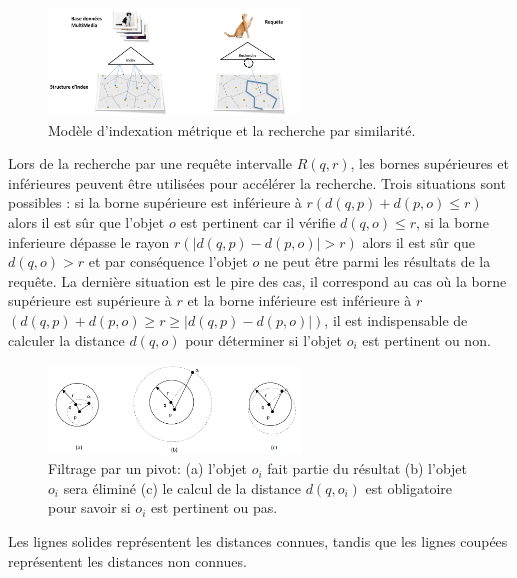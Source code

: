 \begin{figure}[H]
	\centering
	\includegraphics[width=0.6\textwidth]{Figures/similarity.png} %
	\caption{Modèle d'indexation métrique et la recherche par similarité.}
\end{figure}

Lors de la recherche par une requête intervalle $ R(q,r) $, les bornes supérieures et inférieures peuvent être utilisées pour accélérer la recherche. Trois situations sont possibles : si la borne supérieure est inférieure à $  r (d(q,p)+d(p,o) \leq r ) $ alors il est sûr que l’objet $ o $ est pertinent car il vérifie $ d(q,o) \leq r $, si la borne inferieure dépasse le rayon $ r ( |d(q,p)-d(p,o)| > r )  $ alors il est sûr que $ d(q,o) > r $ et par conséquence l’objet $ o $ ne peut être parmi les résultats de la requête. La dernière situation est le pire des cas, il correspond au cas où la borne supérieure est supérieure à $ r $ et la borne inférieure est inférieure à  $ r $  $  (d(q,p)+d(p,o) \geq r\geq |d(q,p)-d(p,o)|) $, il est indispensable de calculer la distance $ d(q,o) $ pour déterminer si l’objet $ o_i $ est pertinent ou non.

\begin{figure}[H]
	\centering
	\includegraphics[width=0.6\textwidth]{Figures/pivot.png} %
	\caption{Filtrage par un pivot: (a) l'objet $  o_i $ fait partie du résultat (b) l'objet $ o_i $ sera éliminé (c) le calcul de la
		distance $ d(q,o_i) $ est obligatoire pour savoir si $ o_i $ est pertinent ou pas.}
\end{figure}

Les lignes solides représentent les distances connues, tandis que les lignes coupées représentent les distances non connues.\\

